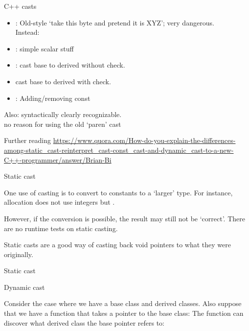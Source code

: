 \begin{slide}{C++ casts}
  \label{sl:cpp-casts}
  \begin{itemize}
  \item {}: 
    Old-style `take this byte and pretend it is XYZ'; very dangerous.\\
    Instead:
  \item {}: simple scalar stuff
  \item {}: cast base to derived without check.
  \item {} cast base to derived with check.
  \item {}: Adding/removing const
  \end{itemize}

  Also: syntactically clearly recognizable.\\
  no reason for using the old `paren' cast
\end{slide}

Further reading \url{https://www.quora.com/How-do-you-explain-the-differences-among-static_cast-reinterpret_cast-const_cast-and-dynamic_cast-to-a-new-C++-programmer/answer/Brian-Bi}

 {Static cast}
\label{sec:cast-static}

One use of casting is to convert to constants to a `larger' type. For
instance, allocation does not use integers but .


However, if the
conversion is possible, the result may still not be `correct'.
%
%
There are no runtime tests on static casting.

Static casts are a good way of casting back void pointers to what they
were originally.

\begin{slide}{Static cast}
  \label{sl:const-cast}
\end{slide}

 {Dynamic cast}

Consider the case where we have a base class and derived classes.
%
%
Also suppose that we have a function that takes a pointer to the base
class:
%
%
The function can discover what derived class the base pointer refers
to:
%

